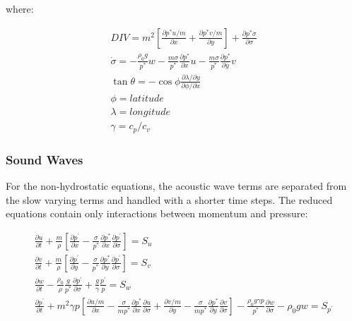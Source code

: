 where:

\begin{eqnarray}
	DIV = m^2 \left[ \frac{\partial{p^{\ast}u/m}}{\partial{x}} +
		\frac{\partial{p^{\ast} v/m}}{\partial{y}} \right] +
		\frac{\partial{p^{\ast} \dot{\sigma}}}{\partial{\sigma}} \\
  \dot{\sigma} = - \frac{\rho_0g}{p^{\ast}}w -
                   \frac{m\sigma}{p^{\ast}}
		   \frac{\partial{p^{\ast}}}{\partial{x}}u -
		   \frac{m\sigma}{p^{\ast}}
		   \frac{\partial{p^{\ast}}}{\partial{y}} v \\
   \tan \theta = - \cos \phi \frac{\partial{\lambda}/ \partial{y}}
				  {\partial{\phi}/ \partial{x}} \\ \nonumber
				 \phi = latitude \\ \nonumber
				 \lambda = longitude \\
   \gamma = c_p / c_v
\end{eqnarray}

\subsubsection{Sound Waves}

For the non-hydrostatic equations, the acoustic wave terms are separated
from the slow varying terms and handled with a shorter time steps. The reduced
equations contain only interactions between momentum and pressure:

\begin{gather}
\frac{\partial{u}}{\partial{t}} + \frac{m}{\rho} \left[
		\frac{\partial{p^\prime}}{\partial{x}} -
		\frac{\sigma}{p^{\ast}}
		\frac{\partial{p^\ast}}{\partial{x}}
		\frac{\partial{p^\prime}}{\partial{\sigma}} \right] = S_u \\
\frac{\partial{v}}{\partial{t}} + \frac{m}{\rho} \left[
		\frac{\partial{p^\prime}}{\partial{y}} -
		\frac{\sigma}{p^{\ast}}
		\frac{\partial{p^\ast}}{\partial{y}}
		\frac{\partial{p^\prime}}{\partial{\sigma}} \right] = S_v \\
\frac{\partial{w}}{\partial{t}} - \frac{\rho_0}{\rho} 
	\frac{g}{p^\ast}\frac{\partial{p^\prime}}{\partial{\sigma}} +
	\frac{g}{\gamma} \frac{p^\prime}{p} = S_w \\
\frac{\partial{p^\prime}}{\partial{t}} + m^2 \gamma p \left[
	  \frac{\partial{u/m}}{\partial{x}} -
	  \frac{\sigma}{mp^\ast}
	  \frac{\partial{p^\ast}}{\partial{x}}
	  \frac{\partial{u}}{\partial{\sigma}} +
	  \frac{\partial{v/m}}{\partial{y}} -
	  \frac{\sigma}{mp^\ast}
	  \frac{\partial{p^\ast}}{\partial{y}}
	  \frac{\partial{v}}{\partial{\sigma}} \right] -
	  \frac{\rho_0 g \gamma p}{p^\ast}
	  \frac{\partial{w}}{\partial{\sigma}} - \rho_0 gw = S_{p^\prime}
\end{gather}

